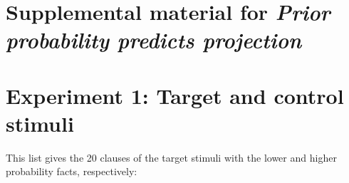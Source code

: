\documentclass[11pt,fleqn]{article}
\newcommand{\6}{\mbox{$[\hspace*{-.6mm}[$}}
\newcommand{\9}{\mbox{$]\hspace*{-.6mm}]$}}
\begin{document}

%

%
%


\newpage

\appendix

\setcounter{table}{0}
\renewcommand{\thetable}{A\arabic{table}}

\setcounter{figure}{0}
\renewcommand{\thefigure}{A\arabic{figure}}

\section*{Supplemental material for {\em Prior probability predicts projection}}

\section{Experiment 1: Target and control stimuli}\label{a-stim}

This list gives the 20 clauses of the target stimuli with the lower and higher probability facts, respectively:
\end{document}
